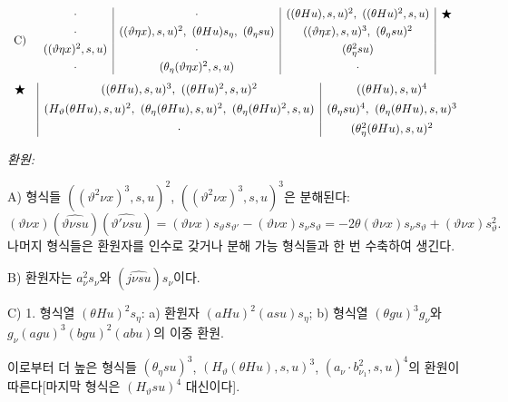 \[
\begin{array}{r@{\quad}c}
\text{C)}&
\begin{array}{c|c|c|c}
\cdot&\cdot&((\theta Hu),s,u)^2,\ ((\theta Hu)^2,s,u)&\bigstar\\[0.35em]
\cdot&((\vartheta\eta x),s,u)^2,\ (\theta Hu)s_\eta,\ (\theta_\eta su)&((\vartheta\eta x),s,u)^3,\ (\theta_\eta su)^2&\\[0.35em]
((\vartheta\eta x)^2,s,u)&\cdot&(\theta_\eta^2su)&\\[0.35em]
\cdot&(\theta_\eta(\vartheta\eta x)^2,s,u)&\cdot&
\end{array}
\end{array}
\]
\[
\begin{array}{c@{\quad}|c|c}
\bigstar&((\theta Hu),s,u)^3,\ ((\theta Hu)^2,s,u)^2&((\theta Hu),s,u)^4\\[0.45em]
&(H_\vartheta(\theta Hu),s,u)^2,\ (\theta_\eta(\theta Hu),s,u)^2,\ (\theta_\eta(\theta Hu)^2,s,u)&(\theta_\eta su)^4,\ (\theta_\eta(\theta Hu),s,u)^3\\[0.45em]
&\cdot&(\theta_\eta^2(\theta Hu),s,u)^2
\end{array}
\]

\noindent\emph{환원:}

A) 형식들 $((\vartheta^2\nu x)^3,s,u)^2$, $((\vartheta^2\nu x)^3,s,u)^3$은 분해된다:
\[
(\vartheta \nu x)(\widehat{\vartheta \nu su})(\widehat{\vartheta'\nu su})
=(\vartheta \nu x)s_\vartheta s_{\vartheta'}-(\vartheta \nu x)s_\nu s_\vartheta
=-2\theta(\vartheta \nu x)s_\nu s_\vartheta+(\vartheta \nu x)s_\vartheta^2.
\]
나머지 형식들은 환원자를 인수로 갖거나 분해 가능 형식들과 한 번 수축하여 생긴다.

B) 환원자는 $a_\nu^2s_\nu$와 $(\widehat{j\nu su})s_\nu$이다.

C) 1. 형식열 $(\theta Hu)^2s_\eta$: a) 환원자 $(aHu)^2(asu)s_\eta$; b) 형식열 $(\theta gu)^3g_\nu$와 $g_\nu(agu)^3(bgu)^2(abu)$의 이중 환원.

이로부터 더 높은 형식들 $(\theta_\eta su)^3$, $(H_\vartheta(\theta Hu),s,u)^3$, $(a_\nu\cdot b_{\nu_1}^2,s,u)^4$의 환원이 따른다[마지막 형식은 $(H_\vartheta su)^4$ 대신이다].

